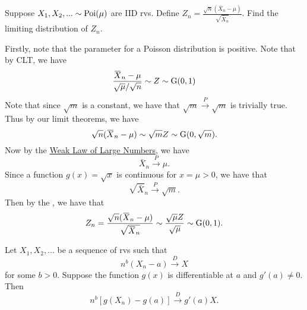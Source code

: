 \documentclass[notoc,notitlepage]{tufte-book}
\newcommand{\convd}{\overset{D}{\to}}
\newcommand{\convp}{\overset{P}{\to}}
\begin{document}
\begin{eg}\label{eg:involved_eg_for_limit_theorems}
  Suppose $X_1, X_2, ... \sim \operatorname{Poi}(\mu)$ are IID rvs. Define $Z_n = \frac{\sqrt{n} ( \bar{X}_n - \mu )}{\sqrt{\bar{X}_n}}$. Find the limiting distribution of $Z_n$.
\end{eg}

\begin{solution}
  Firstly, note that the parameter for a Poisson distribution is positive. Note that by CLT, we have
  \begin{equation*}
    \frac{\bar{X}_n - \mu}{\sqrt{\mu} / \sqrt{n}} \sim Z \sim \Gau(0, 1)
  \end{equation*}
  Note that since $\sqrt{m}$ is a constant, we have that $\sqrt{m} \convp \sqrt{m}$ is trivially true. Thus by our limit theorems, we have
  \begin{equation*}
    \sqrt{n} ( \bar{X}_n - \mu ) \sim \sqrt{m} Z \sim \Gau(0, \sqrt{m}).
  \end{equation*}
  Now by the \hyperref[eg:weak_law_of_large_numbers]{Weak Law of Large Numbers}, we have
  \begin{equation*}
    \bar{X}_n \convp \mu.
  \end{equation*}
  Since a function $g(x) = \sqrt{x}$ is continuous for $x = \mu > 0$, we have that
  \begin{equation*}
    \sqrt{\bar{ X }}_n \convp \sqrt{m}.
  \end{equation*}
  Then by the , we have that
  \begin{equation*}
    Z_n = \frac{\sqrt{n} ( \bar{X}_n - \mu )}{\sqrt{\bar{X}_n}} \sim \frac{\sqrt{\mu} Z}{\sqrt{\mu}} \sim \Gau(0, 1).
  \end{equation*}
\end{solution}

\begin{thm}
\label{thm:generalized_delta_method}
  Let $X_1, X_2, ...$ be a sequence of rvs such that
  \begin{equation*}
    n^b (X_n - a) \convd X
  \end{equation*}
  for some $b > 0$. Suppose the function $g(x)$ is differentiable at $a$ and $g'(a) \neq 0$. Then
  \begin{equation*}
    n^b [ g(X_n) - g(a) ] \convd g'(a) X.
  \end{equation*}
\end{thm}
\end{document}
